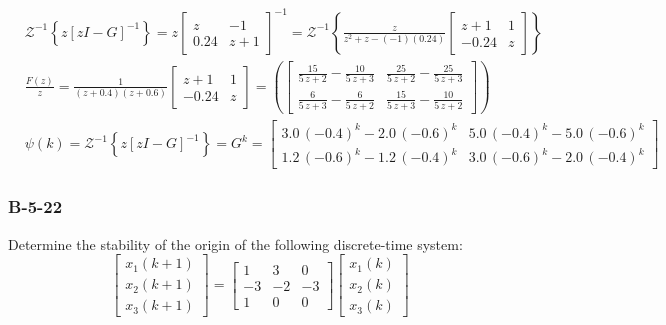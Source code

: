 \begin{align*}
& \mathcal{Z}^{-1} \left\{z[zI-G]^{-1}\right\} = z \begin{bmatrix}
z     &  -1 \\
0.24 & z+1
\end{bmatrix}^{-1}= \mathcal{Z}^{-1} \left\{
\frac{z}{z^2+z-(-1)(0.24)}\begin{bmatrix}
z+1     &  1 \\
-0.24 & z
\end{bmatrix}  \right\} \\
& \frac{F(z)}{z}= %
\frac{1}{(z+0.4)(z+0.6)}\begin{bmatrix}
z+1     &  1 \\
-0.24 & z
\end{bmatrix} %
 = \left(\begin{bmatrix} \frac{15}{5\,z+2}-\frac{10}{5\,z+3} & \frac{25}{5\,z+2}-\frac{25}{5\,z+3}\\ \frac{6}{5\,z+3}-\frac{6}{5\,z+2} & \frac{15}{5\,z+3}-\frac{10}{5\,z+2} \end{bmatrix}\right) \\ %
 & \psi(k)=\mathcal{Z}^{-1} \left\{z[zI-G]^{-1}\right\} = G^k = %
 \begin{bmatrix} 3.0\,{\left(-0.4\right)}^k-2.0\,{\left(-0.6\right)}^k & 5.0\,{\left(-0.4\right)}^k-5.0\,{\left(-0.6\right)}^k\\ 1.2\,{\left(-0.6\right)}^k-1.2\,{\left(-0.4\right)}^k & 3.0\,{\left(-0.6\right)}^k-2.0\,{\left(-0.4\right)}^k\end{bmatrix}
\end{align*}

\subsubsection*{B-5-22}
Determine the stability of the origin of the following discrete-time system:
\[
\begin{bmatrix}
x_1(k+1) \\
x_2(k+1) \\
x_3(k+1)
\end{bmatrix} = \begin{bmatrix}
1  & 3  &  0 \\
-3 & -2 & -3 \\
1  & 0  &  0
\end{bmatrix}\begin{bmatrix}
x_1(k) \\
x_2(k) \\
x_3(k)
\end{bmatrix}
\]

